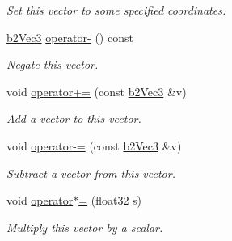 \begin{DoxyCompactItemize}
\begin{DoxyCompactList}\small\item\em Set this vector to some specified coordinates. \end{DoxyCompactList}\item 
\hypertarget{structb2_vec3_a246cb7ed59d3e758989939ed4e30e5ec}{\hyperlink{structb2_vec3}{b2\-Vec3} \hyperlink{structb2_vec3_a246cb7ed59d3e758989939ed4e30e5ec}{operator-\/} () const }\label{structb2_vec3_a246cb7ed59d3e758989939ed4e30e5ec}

\begin{DoxyCompactList}\small\item\em Negate this vector. \end{DoxyCompactList}\item 
\hypertarget{structb2_vec3_a2aaeed3f5308aad85d19c5f0efc72641}{void \hyperlink{structb2_vec3_a2aaeed3f5308aad85d19c5f0efc72641}{operator+=} (const \hyperlink{structb2_vec3}{b2\-Vec3} \&v)}\label{structb2_vec3_a2aaeed3f5308aad85d19c5f0efc72641}

\begin{DoxyCompactList}\small\item\em Add a vector to this vector. \end{DoxyCompactList}\item 
\hypertarget{structb2_vec3_a9e5b535548e1c5dfc0dc258d08f5ca32}{void \hyperlink{structb2_vec3_a9e5b535548e1c5dfc0dc258d08f5ca32}{operator-\/=} (const \hyperlink{structb2_vec3}{b2\-Vec3} \&v)}\label{structb2_vec3_a9e5b535548e1c5dfc0dc258d08f5ca32}

\begin{DoxyCompactList}\small\item\em Subtract a vector from this vector. \end{DoxyCompactList}\item 
\hypertarget{structb2_vec3_aaa9aa20195cd0ee53c7176a9a9b02389}{void \hyperlink{structb2_vec3_aaa9aa20195cd0ee53c7176a9a9b02389}{operator$\ast$=} (float32 s)}\label{structb2_vec3_aaa9aa20195cd0ee53c7176a9a9b02389}

\begin{DoxyCompactList}\small\item\em Multiply this vector by a scalar. \end{DoxyCompactList}\end{DoxyCompactItemize}
